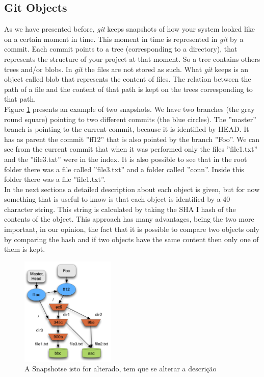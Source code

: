 \subsection{Git Objects}
As we have presented before, \emph{git} keeps snapshots of how your system
looked like on a certain moment in time. This moment in time is
represented in \emph{git} by a commit. Each commit points to a tree
(corresponding to a directory), that
represents the structure of your project at that moment. So a tree
contains others trees and/or blobs. In \emph{git} the files are not stored as such. 
What \emph{git} keeps is an object called blob that represents the content of files. The
relation between the path of a file and the content of that path 
is kept on the trees corresponding to that path. \\

Figure \ref{fig:snapshot} presents an example of two snapshots. We
have two branches (the gray round square) pointing to two different
commits (the blue circles). The ''master'' branch is pointing to the
current commit, because it is identified by HEAD. It has as parent the commit ''ff12''
that is also pointed by the branch ''Foo''. We can see from the current
commit that when it was performed only the files ''file1.txt'' and the
''file3.txt'' were
in the index. It is also possible to see that in the root folder there was
a file called ''file3.txt'' and a folder called ''conn''. Inside this
folder there was a file ''file1.txt''.\\

In the next sections a detailed description about each object is
given, but for now something that is useful to know is that each
object is identified by a 40-character string. This string is
calculated by taking the SHA I hash of the contents of the object.
This approach has many advantages, being the two more important, in our
opinion, the
fact that it is possible to compare two objects only by comparing the hash and
if two objects have the same content then only one of them is kept.

\begin{figure}[!h]
   \centering
   \includegraphics[width=0.4\textwidth]{images/object_assoc.png}
   \caption{A Snapshot\color{red}se isto for alterado, tem que se
   alterar a descrição\color{black}}
   \label{fig:snapshot}
\end{figure}

